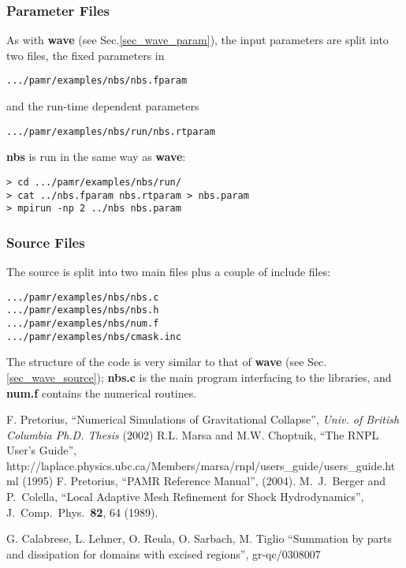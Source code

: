 \documentclass[aps,amssymb,unsortedaddress,nofootinbib]{revtex4}
\begin{document}
\subsubsection{Parameter Files}
As with {\bf wave} (see Sec.\ref{sec_wave_param}), 
the input parameters are split into two files, the fixed parameters
in 
\begin{verbatim}
.../pamr/examples/nbs/nbs.fparam
\end{verbatim}
and the run-time dependent parameters
\begin{verbatim}
.../pamr/examples/nbs/run/nbs.rtparam
\end{verbatim}
{\bf nbs} is run in the same way as {\bf wave}:
\begin{verbatim}
> cd .../pamr/examples/nbs/run/
> cat ../nbs.fparam nbs.rtparam > nbs.param
> mpirun -np 2 ../nbs nbs.param
\end{verbatim}

\subsubsection{Source Files}
The source is split into two main files plus a couple of include files:
\begin{verbatim}
.../pamr/examples/nbs/nbs.c
.../pamr/examples/nbs/nbs.h
.../pamr/examples/nbs/num.f
.../pamr/examples/nbs/cmask.inc
\end{verbatim}
The structure of the code is very similar to that of {\bf wave} (see Sec.\ref{sec_wave_source});
{\bf nbs.c} is the main program interfacing to the libraries,
and {\bf num.f} contains the numerical routines.

\begin{thebibliography}{1}
 F. Pretorius,
 ``Numerical Simulations of Gravitational Collapse'',
 {\em Univ. of British Columbia Ph.D. Thesis} (2002)
 R.L. Marsa and M.W. Choptuik,
 ``The RNPL User's Guide'',\\
 {http://laplace.physics.ubc.ca/Members/marsa/rnpl/users\_guide/users\_guide.html}
 (1995)
 F. Pretorius,
 ``PAMR Reference Manual'', (2004).
 M.\ J.\ Berger and P.\ Colella, ``Local Adaptive
Mesh Refinement for Shock Hydrodynamics'', J.\ Comp.\ Phys.\ {\bf 82}, 64 (1989).

 G. Calabrese, L. Lehner, O. Reula, O. Sarbach, M. Tiglio
   ``Summation by parts and dissipation for domains with excised regions'',
      gr-qc/0308007
\end{thebibliography}
\end{document}
